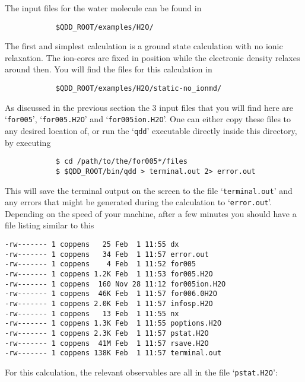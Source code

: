 \documentclass[11pt,a4paper]{article}
\begin{document}
		The input files for the water molecule can be found in 
		\begin{verbatim}
			$QDD_ROOT/examples/H2O/
		\end{verbatim}
		The first and simplest calculation is a ground state calculation with no ionic relaxation. The ion-cores are fixed in position while the electronic density relaxes around then. You will find the files for this calculation in
		\begin{verbatim}
			$QDD_ROOT/examples/H2O/static-no_ionmd/
		\end{verbatim}
		As discussed in the previous section the 3 input files that you will find here are `\texttt{for005}', `\texttt{for005.H2O}' and `\texttt{for005ion.H2O}'. One can either copy these files to any desired location of, or run the `\texttt{qdd}' executable directly inside this directory, by executing
		\begin{verbatim}
			$ cd /path/to/the/for005*/files
			$ $QDD_ROOT/bin/qdd > terminal.out 2> error.out
		\end{verbatim}
		This will save the terminal output on the screen to the file `\texttt{terminal.out}' and any errors that might be generated during the calculation to `\texttt{error.out}'. Depending on the speed of your machine, after a few minutes you should have a file listing similar to this
\vspace{1ex}		
\begin{Verbatim}[frame=single,label=Example directory listing]
-rw------- 1 coppens   25 Feb  1 11:55 dx
-rw------- 1 coppens   34 Feb  1 11:57 error.out
-rw------- 1 coppens    4 Feb  1 11:52 for005
-rw------- 1 coppens 1.2K Feb  1 11:53 for005.H2O
-rw------- 1 coppens  160 Nov 28 11:12 for005ion.H2O
-rw------- 1 coppens  46K Feb  1 11:57 for006.0H2O
-rw------- 1 coppens 2.0K Feb  1 11:57 infosp.H2O
-rw------- 1 coppens   13 Feb  1 11:55 nx
-rw------- 1 coppens 1.3K Feb  1 11:55 poptions.H2O
-rw------- 1 coppens 2.3K Feb  1 11:57 pstat.H2O
-rw------- 1 coppens  41M Feb  1 11:57 rsave.H2O
-rw------- 1 coppens 138K Feb  1 11:57 terminal.out
\end{Verbatim}
		For this calculation, the relevant observables are all in the file `\texttt{pstat.H2O}':
\end{document}
